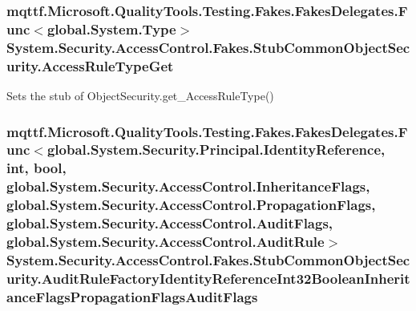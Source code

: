 \hypertarget{class_system_1_1_security_1_1_access_control_1_1_fakes_1_1_stub_common_object_security_ad04c37eb08e7ec19f6b16f7e82c03e34}{
\subsubsection[{Access\-Rule\-Type\-Get}]{\setlength{\rightskip}{0pt plus 5cm}mqttf.\-Microsoft.\-Quality\-Tools.\-Testing.\-Fakes.\-Fakes\-Delegates.\-Func$<$global.\-System.\-Type$>$ System.\-Security.\-Access\-Control.\-Fakes.\-Stub\-Common\-Object\-Security.\-Access\-Rule\-Type\-Get}}\label{class_system_1_1_security_1_1_access_control_1_1_fakes_1_1_stub_common_object_security_ad04c37eb08e7ec19f6b16f7e82c03e34}


Sets the stub of Object\-Security.\-get\-\_\-\-Access\-Rule\-Type()

\hypertarget{class_system_1_1_security_1_1_access_control_1_1_fakes_1_1_stub_common_object_security_a32277ff6742aeb93b466bbec099b5fa9}{
\subsubsection[{Audit\-Rule\-Factory\-Identity\-Reference\-Int32\-Boolean\-Inheritance\-Flags\-Propagation\-Flags\-Audit\-Flags}]{\setlength{\rightskip}{0pt plus 5cm}mqttf.\-Microsoft.\-Quality\-Tools.\-Testing.\-Fakes.\-Fakes\-Delegates.\-Func$<$global.\-System.\-Security.\-Principal.\-Identity\-Reference, int, bool, global.\-System.\-Security.\-Access\-Control.\-Inheritance\-Flags, global.\-System.\-Security.\-Access\-Control.\-Propagation\-Flags, global.\-System.\-Security.\-Access\-Control.\-Audit\-Flags, global.\-System.\-Security.\-Access\-Control.\-Audit\-Rule$>$ System.\-Security.\-Access\-Control.\-Fakes.\-Stub\-Common\-Object\-Security.\-Audit\-Rule\-Factory\-Identity\-Reference\-Int32\-Boolean\-Inheritance\-Flags\-Propagation\-Flags\-Audit\-Flags}}\label{class_system_1_1_security_1_1_access_control_1_1_fakes_1_1_stub_common_object_security_a32277ff6742aeb93b466bbec099b5fa9}


